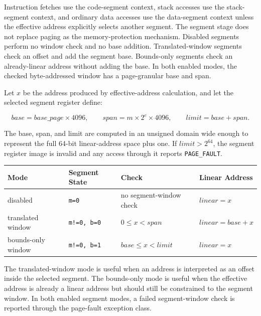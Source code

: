 Instruction fetches use the code-segment context, stack accesses use the stack-segment
context, and ordinary data accesses use the data-segment context unless the effective
address explicitly selects another segment. The segment stage does not replace paging
as the memory-protection mechanism. Disabled segments perform no window check and no
base addition. Translated-window segments check an offset and add the segment base.
Bounds-only segments check an already-linear address without adding the base. In both
enabled modes, the checked byte-addressed window has a page-granular base and span.

Let \(x\) be the address produced by effective-address calculation, and let the selected
segment register define:

\[
\mathit{base} = \mathit{base\_page} \times 4096,\qquad
\mathit{span} = m \times 2^e \times 4096,\qquad
\mathit{limit} = \mathit{base} + \mathit{span}.
\]

The base, span, and limit are computed in an unsigned domain wide enough to represent
the full 64-bit linear-address space plus one. If \(\mathit{limit} > 2^{64}\), the
segment register image is invalid and any access through it reports \texttt{PAGE\_FAULT}.

\begingroup\footnotesize
\begin{longtable}{@{}p{1.15in}p{1.0in}p{1.55in}p{1.80in}@{}}
\toprule
\textbf{Mode} & \textbf{Segment State} & \textbf{Check} & \textbf{Linear Address}\\
\midrule
\endhead
disabled & \texttt{m=0} & no segment-window check & \(\mathit{linear}=x\)\\
translated window & \texttt{m!=0, b=0} & \(0 \le x < \mathit{span}\) & \(\mathit{linear}=\mathit{base}+x\)\\
bounds-only window & \texttt{m!=0, b=1} & \(\mathit{base} \le x < \mathit{limit}\) & \(\mathit{linear}=x\)\\
\bottomrule
\end{longtable}
\endgroup

The translated-window mode is useful when an address is interpreted as an offset inside
the selected segment. The bounds-only mode is useful when the effective address is already
a linear address but should still be constrained to the segment window. In both enabled
segment modes, a failed segment-window check is reported through the page-fault exception
class.

